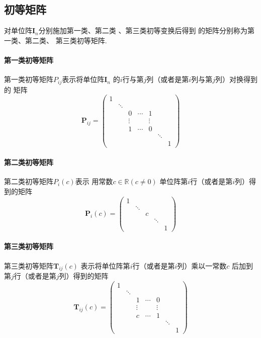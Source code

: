 \subsection{初等矩阵}
\begin{formal}
\begin{definition}[初等矩阵]\label{def:初等矩阵}
    对单位阵$\bm{I}_n$分别施加第一类、第二类
    、第三类初等变换后得到
    的矩阵分别称为第一类、第二类、
    第三类初等矩阵.
\paragraph{第一类初等矩阵}
第一类初等矩阵$P_{ij}$表示将单位阵$\bm{I}_n$
的$i$行与第$j$列（或者是第$i$列与第$j$列）对换得到的
矩阵
\[
\bm{P}_{ij} = 
\begin{pmatrix}
    1 & & & & & & \\
     & \ddots & & &&&\\
     &&0&\cdots&1&&\\
    &&\vdots&&\vdots&&\\
    && 1 & \cdots & 0 &&\\
    &&&&&\ddots&\\
    &&&&&&1
\end{pmatrix}
\]
\paragraph{第二类初等矩阵}
第二类初等矩阵$P_i\left(c\right)$表示
用常数$c \in \mathbb{R}\left(c \neq 0\right)$
单位阵第$i$行（或者是第$i$列）得到的矩阵
\[
\bm{P}_i\left(c\right) = 
\begin{pmatrix}
    1 & & & & \\
      &\ddots&&&\\
    &&c&&\\
    &&&\ddots&\\
    &&&&1
\end{pmatrix}
\]
\paragraph{第三类初等矩阵}
第三类初等矩阵$\bm{T}_{ij}\left(c\right)$
表示将单位阵第$i$行（或者是第$i$列）乘以一常数$c$
后加到第$j$行（或者是第$j$列）得到的矩阵
\[
\bm{T}_{ij} \left(c\right)= 
\begin{pmatrix}
    1 & & & & & & \\
     & \ddots & & &&&\\
     &&1&\cdots&0&&\\
    &&\vdots&&\vdots&&\\
    && c & \cdots & 1 &&\\
    &&&&&\ddots&\\
    &&&&&&1
\end{pmatrix}
\]
\end{definition}
\end{formal}

